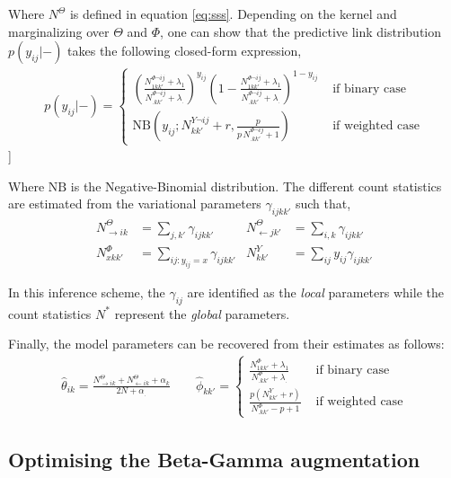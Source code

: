Where $N^{\Theta}$ is defined in equation \eqref{eq:sss}.
Depending on the kernel and marginalizing over $\Theta$ and $\Phi$, one can show that the predictive link distribution $p(y_{ij}|-)$ takes the following closed-form expression,
\begin{align*}
p(y_{ij} |-)=\begin{cases}
    \left( \frac{ N^{\Phi\neg ij}_{1 kk'} + \lambda_1}{N^{\Phi\neg ij}_{\bm{.}kk'} + \lambda_{\bm{.}}}\right)^{y_{ij}} \left( 1- \frac{ N^{\Phi\neg ij}_{1 kk'} + \lambda_1}{N^{\Phi\neg ij}_{\bm{.}kk'} + \lambda_{\bm{.}}}\right)^{1-y_{ij}}  & \textrm{ if binary case} \\
    \mathrm{NB}\left(y_{ij}; N^{Y\neg ij}_{kk'} + r, \frac{p}{p\,N^{\Phi\neg ij}_{\bm{.}kk'} + 1} \right) & \textrm{ if weighted case} 
\end{cases}
\end{align*}]

Where $\textrm{NB}$ is the Negative-Binomial distribution. The different count statistics are estimated from the variational parameters $\gamma_{ijkk'}$ such that,
\begin{align} \label{eq:sss}
    N^{\Theta}_{\rightarrow ik} &= \sum_{j, k'} \gamma_{ijkk'}        & N^{\Theta}_{\leftarrow jk'} &= \sum_{i, k} \gamma_{ijkk'}  \nonumber \\
    N^{\Phi}_{xkk'} &= \sum_{ij:y_{ij}=x} \gamma_{ijkk'}  & N^{Y}_{kk'} &= \sum_{ij} y_{ij}\gamma_{ijkk'}
\end{align}

In this inference scheme, the $\gamma_{ij}$ are identified as the \emph{local} parameters while the count statistics $N^*$ represent the \emph{global} parameters.  

Finally, the model parameters can be recovered from their estimates as follows:
\begin{align*}
\hat \theta_{ik} = \frac{N^{\Theta}_{\rightarrow ik} + N^{\Theta}_{\leftarrow ik} + \alpha_k}{2N + \alpha_{\bm{.}}} \qquad 
\hat \phi_{kk'}=\begin{cases}
     \frac{N^{\Phi}_{1 kk'} + \lambda_1}{N^{\Phi}_{\bm{.}kk'} + \lambda_{\bm{.}}} & \textrm{ if binary case} \\
    \frac{p(N^Y_{kk'} + r)}{N^{\Phi}_{\bm{.}kk'} - p + 1}  & \textrm{ if weighted case} 
    \end{cases}
\end{align*}


\subsection{Optimising the Beta-Gamma augmentation}

